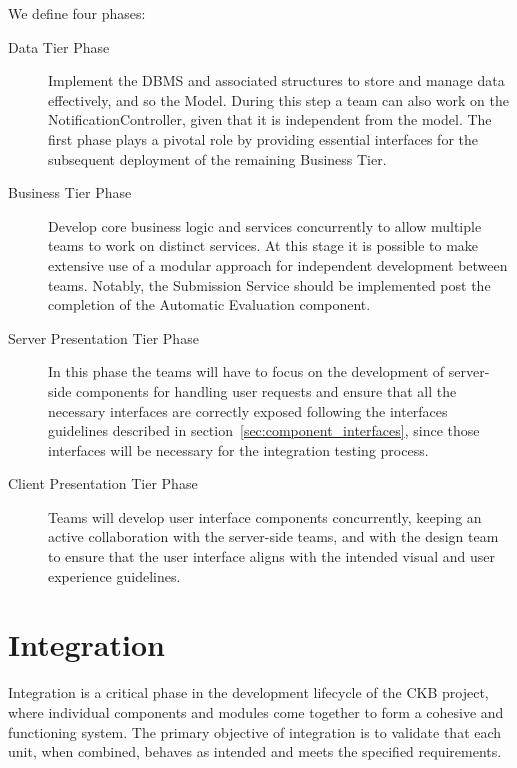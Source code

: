 \documentclass[11pt]{report}
\begin{document}
\noindent
We define four phases:
\begin{description}
    \item[Data Tier Phase] Implement the DBMS and associated structures to store and manage data effectively, and so the Model.
    During this step a team can also work on the NotificationController, given that it is independent from the model.
    The first phase plays a pivotal role by providing essential interfaces for the subsequent deployment of the remaining Business Tier.
    \item[Business Tier Phase] Develop core business logic and services concurrently to allow multiple teams to work on distinct services.
    At this stage it is possible to make extensive use of a modular approach for independent development between teams.
    Notably, the Submission Service should be implemented post the completion of the Automatic Evaluation component.
    \item[Server Presentation Tier Phase ] In this phase the teams will have to focus on the development of server-side components for handling user requests
    and ensure that all the necessary interfaces are correctly exposed following the interfaces guidelines described in section~\ref{sec:component_interfaces},
    since those interfaces will be necessary for the integration testing process.
    \item[Client Presentation Tier Phase] Teams will develop user interface components concurrently, keeping an active 
    collaboration with the server-side teams, and with the design team to ensure that the user interface aligns with the intended visual and user experience guidelines.
\end{description}

\section{Integration}
Integration is a critical phase in the development lifecycle of the CKB project, where individual components and modules come together to form a cohesive and functioning system.
The primary objective of integration is to validate that each unit, when combined, behaves as intended and meets the specified requirements.
\\
\end{document}
